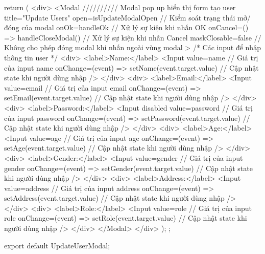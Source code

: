 {  return (
    <div>
      <Modal ////////// Modal pop up hiển thị form tạo user
        title="Update Users"
        open={isUpdateModalOpen} // Kiểm soát trạng thái mở/đóng của modal
        onOk={handleOk} // Xử lý sự kiện khi nhấn OK
        onCancel={() => handleCloseModal()} // Xử lý sự kiện khi nhấn Cancel
        maskClosable={false} // Không cho phép đóng modal khi nhấn ngoài vùng modal
      >
        {/* Các input để nhập thông tin user */}
        <div>
          <label>Name:</label>
          <Input
            value={name} // Giá trị của input name
            onChange={(event) => setName(event.target.value)} // Cập nhật state khi người dùng nhập
          />
        </div>
        <div>
          <label>Email:</label>
          <Input
            value={email} // Giá trị của input email
            onChange={(event) => setEmail(event.target.value)} // Cập nhật state khi người dùng nhập
          />
        </div>
        <div>
          <label>Password:</label>
          <Input
            disabled
            value={password} // Giá trị của input password
            onChange={(event) => setPassword(event.target.value)} // Cập nhật state khi người dùng nhập
          />
        </div>
        <div>
          <label>Age:</label>
          <Input
            value={age} // Giá trị của input age
            onChange={(event) => setAge(event.target.value)} // Cập nhật state khi người dùng nhập
          />
        </div>
        <div>
          <label>Gender:</label>
          <Input
            value={gender} // Giá trị của input gender
            onChange={(event) => setGender(event.target.value)} // Cập nhật state khi người dùng nhập
          />
        </div>
        <div>
          <label>Address:</label>
          <Input
            value={address} // Giá trị của input address
            onChange={(event) => setAddress(event.target.value)} // Cập nhật state khi người dùng nhập
          />
        </div>
        <div>
          <label>Role:</label>
          <Input
            value={role} // Giá trị của input role
            onChange={(event) => setRole(event.target.value)} // Cập nhật state khi người dùng nhập
          />
        </div>
      </Modal>
    </div>
  );
};

export default UpdateUserModal;
